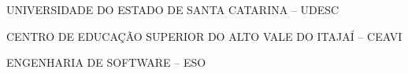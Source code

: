 

\renewcommand{\imprimircapa}{%
	\begin{capa}%
		\center

		{\fontseries{b}\selectfont\MakeTextUppercase{UNIVERSIDADE DO ESTADO DE SANTA CATARINA -- UDESC}}

		{\fontseries{b}\selectfont\MakeTextUppercase{CENTRO DE EDUCAÇÃO SUPERIOR DO ALTO VALE DO ITAJAÍ -- CEAVI  }}

		{\fontseries{b}\selectfont\MakeTextUppercase{ENGENHARIA DE SOFTWARE -- ESO  }}

		\vfill

		{\fontseries{b}\selectfont\MakeTextUppercase{\normalsize\imprimirautor}}

		\vfill
		\begin{center}
		{\fontseries{b}\selectfont\MakeTextUppercase{\imprimirtitulo}}
		\end{center}
		\vfill

		\vfill

		{\fontseries{b}\selectfont\MakeTextUppercase{\imprimirlocal}}
		\par
		{\selectfont \imprimirdata}
		\vspace*{1cm}
	\end{capa}
}



\imprimircapa				%


